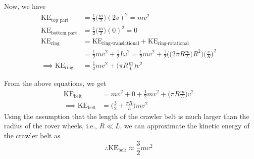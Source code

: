 Now, we have
\begin{align*}
    \text{KE}_{\text{top part}}
     & =
    \frac{1}{2} \Big(\frac{m}{2}\Big) {(2v)}^2
    = m v^2
    \tag{4.2}
    \\
    \text{KE}_{\text{bottom part}}
     & =
    \frac{1}{2} \Big(\frac{m}{2}\Big) {(0)}^2
    = 0
    \tag{4.3}
    \\
    \text{KE}_{\text{ring}}
     & =
    \text{KE}_{\text{ring-translational}}
    + \text{KE}_{\text{ring-rotational}}
    \\ & =
    \frac{1}{2} m v^2
    + \frac{1}{2} I \omega^2
    = \frac{1}{2} m v^2
    + \frac{1}{2} \Bigg(\Big(2\pi R\frac{m}{L}\Big)R^2\Bigg) {\Big(\frac{v}{R}\Big)}^2
    \\
    \implies
    \text{KE}_{\text{ring}}
     & =
    \frac{1}{2} m v^2
    + \Big(\pi R\frac{m}{L}\Big) v^2
    \tag{4.4}
\end{align*}

From the above equations, we get
\begin{align*}
    \text{KE}_{\text{belt}}
     & =
    m v^2
    + 0
    + \frac{1}{2} m v^2
    + \Big(\pi R\frac{m}{L}\Big) v^2
    \\
    \implies
    \text{KE}_{\text{belt}}
     & =
    \Big(
    \frac{3}{2}
    + \frac{\pi R}{L}
    \Big)
    m v^2
    \tag{4.5}
\end{align*}
Using the assumption that the length of the crawler belt is much larger than the radius of the rover wheels, i.e., \( R \ll L \), we can approximate the kinetic energy of the crawler belt as
\begin{equation*}
    \therefore
    \boxed{
    \text{KE}_{\text{belt}}
    \approx
    \frac{3}{2} m v^2
    }
\end{equation*}
